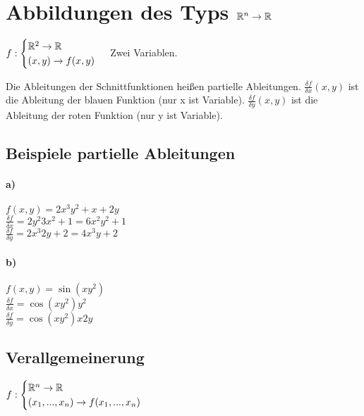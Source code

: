 \renewcommand{\ldate}{2015-10-01}	%

\section{Abbildungen des Typs $\mathbb{R}^n \rightarrow \mathbb{R}$}
$f: 
\begin{cases}
 \mathbb{R}^2 \rightarrow \mathbb{R}\\
 (x,y)\rightarrow f(x,y)
\end{cases}
$
Zwei Variablen.  


Die Ableitungen der Schnittfunktionen heißen partielle Ableitungen. $\frac{\delta f}{\delta x} (x,y)$ ist die Ableitung der blauen Funktion (nur x ist Variable). $\frac{\delta f}{\delta y} (x,y)$ ist die Ableitung der roten Funktion (nur y ist Variable).

\subsection{Beispiele partielle Ableitungen}

\paragraph{a)} $f(x,y)= 2x^3 y^2 + x + 2y $\\
$\frac{\delta f}{\delta x} = 2y^2 3x^2 + 1 = 6x^2 y^2 + 1$\\
$\frac{\delta f}{\delta y} = 2x^3 2y + 2 = 4x^3 y + 2$

\paragraph{b)} $f(x,y) = \sin(x y^2)$\\
$\frac{\delta f}{\delta x} = \cos(x y^2) y^2$\\
$\frac{\delta f}{\delta y} = \cos(x y^2) x 2y$

\subsection{Verallgemeinerung}
$f: 
\begin{cases}
 \mathbb{R}^n \rightarrow \mathbb{R}\\
 (x_1, ..., x_n) \rightarrow f(x_1, ..., x_n)\\
\end{cases}
$\\

